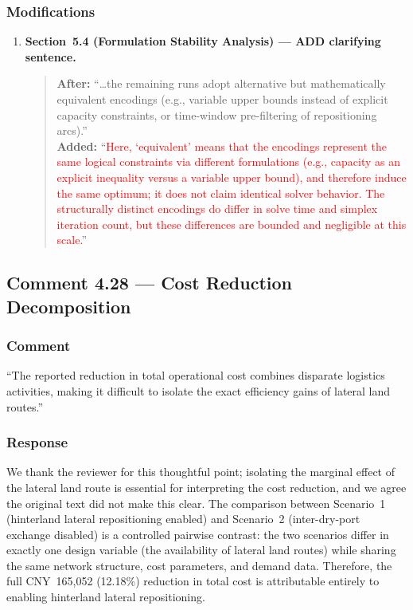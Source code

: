 \documentclass[11pt,a4paper]{article}
\begin{document}
\subsubsection{Modifications}
\begin{enumerate}
\item \textbf{Section~5.4 (Formulation Stability Analysis) --- ADD clarifying sentence.}
\begin{quote}
\textbf{After:} ``\ldots the remaining runs adopt alternative but mathematically equivalent encodings (e.g., variable upper bounds instead of explicit capacity constraints, or time-window pre-filtering of repositioning arcs).''\\[4pt]
\textbf{Added:} ``\textcolor{red}{Here, `equivalent' means that the encodings represent the same logical constraints via different formulations (e.g., capacity as an explicit inequality versus a variable upper bound), and therefore induce the same optimum; it does not claim identical solver behavior. The structurally distinct encodings do differ in solve time and simplex iteration count, but these differences are bounded and negligible at this scale.}''
\end{quote}
\end{enumerate}

\subsection{Comment 4.28 --- Cost Reduction Decomposition}

\subsubsection{Comment}
``The reported reduction in total operational cost combines disparate logistics activities, making it difficult to isolate the exact efficiency gains of lateral land routes.''

\subsubsection{Response}
We thank the reviewer for this thoughtful point; isolating the marginal effect of the lateral land route is essential for interpreting the cost reduction, and we agree the original text did not make this clear. The comparison between Scenario~1 (hinterland lateral repositioning enabled) and Scenario~2 (inter-dry-port exchange disabled) is a controlled pairwise contrast: the two scenarios differ in exactly one design variable (the availability of lateral land routes) while sharing the same network structure, cost parameters, and demand data. Therefore, the full CNY~165,052 (12.18\%) reduction in total cost is attributable entirely to enabling hinterland lateral repositioning.
\end{document}
